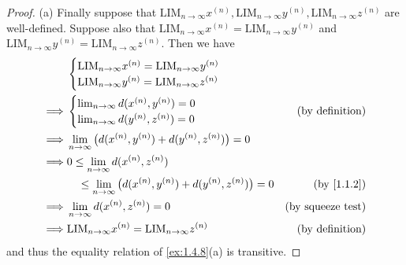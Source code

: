 \begin{proof}{(a)}
  Finally suppose that \(\text{LIM}_{n \to \infty} x^{(n)}, \text{LIM}_{n \to \infty} y^{(n)}, \text{LIM}_{n \to \infty} z^{(n)}\) are well-defined.
  Suppose also that \(\text{LIM}_{n \to \infty} x^{(n)} = \text{LIM}_{n \to \infty} y^{(n)}\) and \(\text{LIM}_{n \to \infty} y^{(n)} = \text{LIM}_{n \to \infty} z^{(n)}\).
  Then we have
  \begin{align*}
             & \begin{cases}
                 \text{LIM}_{n \to \infty} x^{(n)} = \text{LIM}_{n \to \infty} y^{(n)} \\
                 \text{LIM}_{n \to \infty} y^{(n)} = \text{LIM}_{n \to \infty} z^{(n)}
               \end{cases}                                             \\
    \implies & \begin{cases}
                 \lim_{n \to \infty} d(x^{(n)}, y^{(n)}) = 0 \\
                 \lim_{n \to \infty} d(y^{(n)}, z^{(n)}) = 0
               \end{cases}                                         & \text{(by definition)}                                      \\
    \implies & \lim_{n \to \infty} \big(d(x^{(n)}, y^{(n)}) + d(y^{(n)}, z^{(n)})\big) = 0                                       \\
    \implies & 0 \leq \lim_{n \to \infty} d(x^{(n)}, z^{(n)})                                                                    \\
             & \quad \leq \lim_{n \to \infty} \big(d(x^{(n)}, y^{(n)}) + d(y^{(n)}, z^{(n)})\big) = 0 & \text{(by \cref{1.1.2})} \\
    \implies & \lim_{n \to \infty} d(x^{(n)}, z^{(n)}) = 0                                            & \text{(by squeeze test)} \\
    \implies & \text{LIM}_{n \to \infty} x^{(n)} = \text{LIM}_{n \to \infty} z^{(n)}                  & \text{(by definition)}
  \end{align*}
  and thus the equality relation of \cref{ex:1.4.8}(a) is transitive.
\end{proof}

